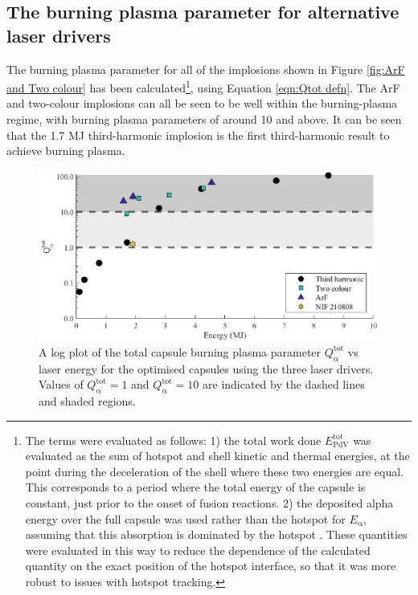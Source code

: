 \subsection{The burning plasma parameter for alternative laser drivers}

The burning plasma parameter for all of the implosions shown in Figure \ref{fig:ArF and Two colour} has been calculated\footnote{The terms were evaluated as follows: 1) the total work done $E^\mathrm{{tot}}_{\mathrm{PdV}}$ was evaluated as the sum of hotspot and shell kinetic and thermal energies, at the point during the deceleration of the shell where these two energies are equal. This corresponds to a period where the total energy of the capsule is constant, just prior to the onset of fusion reactions. 2) the deposited alpha energy over the full capsule was used rather than the hotspot for $E_\mathrm{\alpha}$, assuming that this absorption is dominated by the hotspot \cite{Christopherson2018}. These quantities were evaluated in this way to reduce the dependence of the calculated quantity on the exact position of the hotspot interface, so that it was more robust to issues with hotspot tracking.}, using Equation \ref{eqn:Qtot defn}. The ArF and two-colour implosions can all be seen to be well within the burning-plasma regime, with burning plasma parameters of around 10 and above. It can be seen that the 1.7 MJ third-harmonic implosion is the first third-harmonic result to achieve burning plasma.

\begin{figure}[ht]
\centering
\includegraphics{figures/FurtherSims/QTwoColour.eps}
\caption{A log plot of the total capsule burning plasma parameter $Q^\mathrm{{tot}}_{\mathrm{\alpha}}$ vs laser energy for the optimised capsules using the three laser drivers. Values of $Q^\mathrm{{tot}}_{\mathrm{\alpha}} = 1$ and $Q^\mathrm{{tot}}_{\mathrm{\alpha}} = 10$ are indicated by the dashed lines and shaded regions.}
\label{fig:TwoColourQ}
\end{figure}

